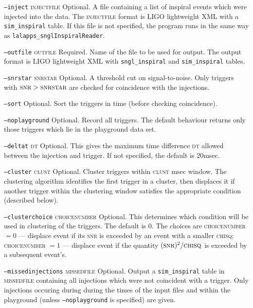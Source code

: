 \begin{entry}
\begin{entry}
\item[\texttt{--inject} \textsc{injectfile}] Optional.  A file
containing a list of inspiral events which were injected into the
data.  The \textsc{injectfile} format is LIGO lightweight XML with a
\texttt{sim\_inspiral} table. If this file is not specified, the
program runs in the same way as \texttt{lalapps\_snglInspiralReader}.

\item[\texttt{--outfile} \textsc{outfile}] Required.  Name of the file
to be used for output.  The output format is LIGO lightweight XML with
\texttt{sngl\_inspiral} and \texttt{sim\_inspiral} tables.

\item[\texttt{--snrstar} \textsc{snrstar}] Optional.  A threshold cut
on signal-to-noise.  Only triggers with $\textsc{snr} > \textsc{snrstar}$
are checked for coincidence with the injections.

\item[\texttt{--sort}] Optional.   Sort the triggers in time (before
checking coincidence).  

\item[\texttt{--noplayground}] Optional.  Record all triggers.  The
default behaviour returns only those triggers which lie in the
playground data set.  

\item[\texttt{--deltat} \textsc{dt}] Optional.  This gives the maximum time
difference \textsc{dt} allowed between the injection and trigger.  If
not specified, the default is 20msec.  

\item[\texttt{--cluster} \textsc{clust}] Optional.  Cluster triggers
within \textsc{clust} msec window.   The clustering algorithm
identifies the first trigger in a cluster, then displaces it if another 
trigger within the clustering window satisfies the appropriate condition 
(described below).

\item[\texttt{--clusterchoice} \textsc{choicenumber}]  Optional.  This
determines which condition will be used in clustering of the triggers.  
The default is 0.  The choices are \textsc{choicenumber} $=0$ --- displace
event if its \textsc{snr} is exceeded by an event with a smaller 
\textsc{chisq}; \textsc{choicenumber} $=1$ --- displace event if the quantity
$(\textsc{snr})^{2}/\textsc{chisq}$ is exceeded by a subsequent event's.

\item[\texttt{--missedinjections} \textsc{missedfile}]  Optional.
Output a \texttt{sim\_inspiral} table in \textsc{missedfile} containing
all injections which were not coincident with a trigger.  Only
injections occuring during during the times of the input files and
within the playground (unless \texttt{--noplayground} is specified)
are given.
 

\end{entry}
\end{entry}
